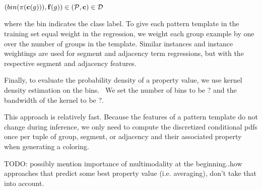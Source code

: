 $(bin(\pi(\mathbf{c}(g))), \mathbf{f}(g)) \in (\mathcal{P}, \mathbf{c}) \in \mathcal{D}$ 

where the bin indicates the class label. To give each pattern template in the training set equal weight in the regression, we weight each group example by one over the number of groups in the template. Similar instances and instance weightings are used for segment and adjacency term regressions, but with the respective segment and adjacency features.~

Finally, to evaluate the probability density of a property value, we use kernel density estimation on the bins.~ We set the number of bins to be ? and the bandwidth of the kernel to be ?.~

This approach is relatively fast. Because the features of a pattern template do not change during inference, we only need to compute the discretized conditional pdfs once per tuple of group, segment, or adjacency and their associated property when generating a coloring.~

TODO: possibly mention importance of multimodality at the beginning..how approaches that predict some best property value (i.e. averaging), don't take that into account.~

